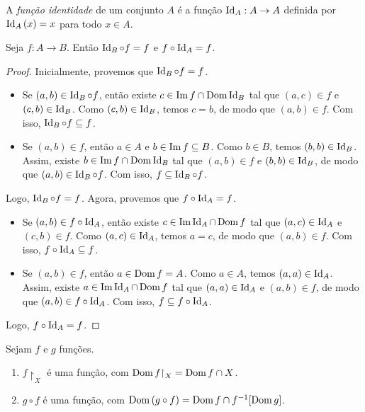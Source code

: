 \begin{definition}
    A \emph{função identidade} de um conjunto $A$ é a função $\operatorname{Id}_A : A \to A$ definida por $\operatorname{Id}_A{(x)} = x$ para todo $x \in A$.
\end{definition}

\begin{proposition}
    Seja $f: A \to B$. Então $\operatorname{Id}_B \circ f = f$ e $f \circ \operatorname{Id}_A = f$.
\end{proposition}

\begin{proof}
    Inicialmente, provemos que $\operatorname{Id}_B \circ f = f$.
        \begin{itemize}[align=left]
            \item[($\subseteq$)] Se $(a,b) \in \operatorname{Id}_B \circ f$, então existe $c \in \operatorname{Im} f \cap \operatorname{Dom} \operatorname{Id}_B$ tal que $(a,c) \in f$ e $(c,b) \in \operatorname{Id}_B$. Como $(c,b) \in \operatorname{Id}_B$, temos $c=b$, de modo que $(a,b) \in f$. Com isso, $\operatorname{Id}_B \circ f \subseteq f$.
            \item[($\supseteq$)] Se $(a,b) \in f$, então $a \in A$ e $b \in \operatorname{Im} f \subseteq B$. Como $b \in B$, temos $(b,b) \in \operatorname{Id}_B$. Assim, existe $b \in \operatorname{Im} f \cap \operatorname{Dom} \operatorname{Id}_B$ tal que $(a,b) \in f$ e $(b,b) \in \operatorname{Id}_B$, de modo que $(a,b) \in \operatorname{Id}_B \circ f$. Com isso, $f \subseteq \operatorname{Id}_B \circ f$.
        \end{itemize}
    Logo, $\operatorname{Id}_B \circ f = f$. Agora, provemos que $f \circ \operatorname{Id}_A = f$.
        \begin{itemize}[align=left]
            \item[($\subseteq$)] Se $(a,b) \in f \circ \operatorname{Id}_A$, então existe $c \in \operatorname{Im} \operatorname{Id}_A \cap \operatorname{Dom} f$ tal que $(a,c) \in \operatorname{Id}_A$ e $(c,b) \in f$. Como $(a,c) \in \operatorname{Id}_A$, temos $a=c$, de modo que $(a,b) \in f$. Com isso, $f \circ \operatorname{Id}_A \subseteq f$.
            \item[($\supseteq$)] Se $(a,b) \in f$, então $a \in \operatorname{Dom} f = A$. Como $a \in A$, temos $(a,a) \in \operatorname{Id}_A$. Assim, existe $a \in \operatorname{Im} \operatorname{Id}_A \cap \operatorname{Dom} f$ tal que $(a,a) \in \operatorname{Id}_A$ e $(a,b) \in f$, de modo que $(a,b) \in f \circ \operatorname{Id}_A$. Com isso, $f \subseteq f \circ \operatorname{Id}_A$.
        \end{itemize}
    Logo, $f \circ \operatorname{Id}_A = f$. \blackproof
\end{proof}

\begin{proposition}
    Sejam $f$ e $g$ funções.
        \begin{enumerate}[leftmargin=*, align=left, label=\textbf{(\alph*)}]
            \item $f \restriction_X$ é uma função, com $\Dom f \restriction_X =  \Dom f \cap X$.
            \item $g \circ f$ é uma função, com $\operatorname{Dom} \, (g \circ f) = \operatorname{Dom} f \cap f^{-1}[\operatorname{Dom} g]$.
        \end{enumerate}
\end{proposition}


